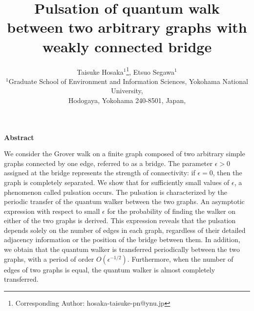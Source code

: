 \documentclass[12pt]{article}
\title{Pulsation of quantum walk between two arbitrary graphs with weakly connected bridge}
\author{Taisuke Hosaka$^{1}$\thanks{Corresponding Author: hosaka-taisuke-pn@ynu.jp },  Etsuo Segawa$^1$\\
$^1${\small Graduate School of Environment and Information Sciences, Yokohama National University,}\\ 
{\small Hodogaya, Yokohama 240-8501, Japan,
}\\}
\date{}
\numberwithin{lemma}{section}
\numberwithin{proposition}{section}
\numberwithin{remark}{section}
\numberwithin{definition}{section}
\begin{document}
\maketitle
\centerline{\textbf{Abstract}}
We consider the Grover walk on a finite graph composed of two arbitrary simple graphs connected by one edge, referred to as a bridge. 
The parameter $\epsilon>0$ assigned at the bridge represents the strength of connectivity: if $\epsilon=0$, then the graph is completely separated. We show that for sufficiently small values of $\epsilon$, a phenomenon called pulsation occurs. The pulsation is characterized by the periodic transfer of the quantum walker between the two graphs. An asymptotic expression with respect to small $\epsilon$ for the probability of finding the walker on either of the two graphs is derived. This expression reveals that the pulsation depends solely on the number of edges in each graph, regardless of their detailed adjacency information or the position of the bridge between them. In addition, we obtain that the quantum walker is transferred periodically between the two graphs, with a period of order $O(\epsilon^{-1/2})$. Furthermore, when the number of edges of two graphs is equal, the quantum walker is almost completely transferred.

\end{document}
